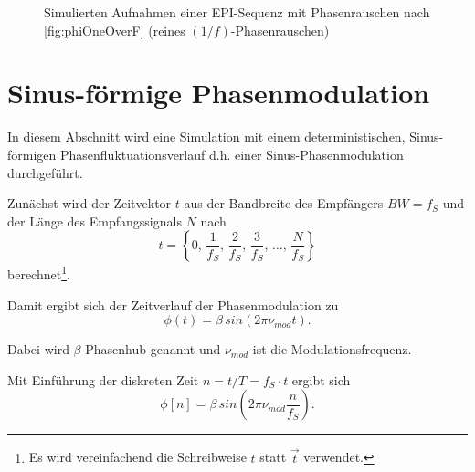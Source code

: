 \begin{figure}[H]
	\hfill
	\hfill
	\caption[($1/f$)-Rauschen (EPI-Sequenz)]{Simulierten Aufnahmen einer EPI-Sequenz mit Phasenrauschen nach \autoref{fig:phiOneOverF} (reines $(1/f)$-Phasenrauschen)}
	\label{fig:oneOverfEPI}	
\end{figure}





\clearpage
\section{Sinus-förmige Phasenmodulation}
In diesem Abschnitt wird eine Simulation mit einem deterministischen, Sinus-förmigen Phasenfluktuationsverlauf d.h. einer Sinus-Phasenmodulation durchgeführt.

Zunächst wird der Zeitvektor $t$ aus der Bandbreite des Empfängers $BW=f_S$ und der Länge des Empfangssignals $N$ nach
\begin{equation}
	t=\left\{0,\,\frac{1}{f_S},\,\frac{2}{f_S},\,\frac{3}{f_S},\,\dots,\,\frac{N}{f_S}\right\}
\end{equation}
berechnet\footnote{Es wird vereinfachend die Schreibweise $t$ statt $\vec{t}$ verwendet.}.

Damit ergibt sich der Zeitverlauf der Phasenmodulation zu
\begin{equation}
	\phi(t) = \beta\, sin(2\pi \nu_{mod} t).
\end{equation}

Dabei wird $\beta$ Phasenhub genannt und $\nu_{mod}$ ist die Modulationsfrequenz.

Mit Einführung der diskreten Zeit $n = t/T = f_S \cdot t$ ergibt sich
\begin{equation}
	\phi[n] = \beta\, sin(2\pi \nu_{mod} \frac{n}{f_S}).
\end{equation}

